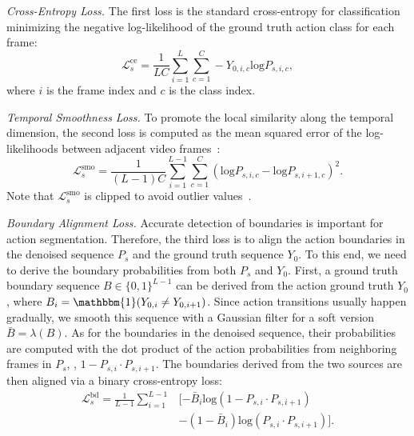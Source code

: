 \documentclass[10pt,twocolumn,letterpaper]{article}
\begin{document}
\textit{Cross-Entropy Loss.} 
The first loss is the standard cross-entropy for classification minimizing the negative log-likelihood of the ground truth action class for each frame:
\begin{equation}  \label{eq:8}
\mathcal{L}^{\mathrm{ce}}_s = \frac{1}{LC}\sum_{i=1}^L\sum_{c=1}^C -Y_{0,i,c} \mathrm{log}P_{s,i,c},
\end{equation}
where $i$ is the frame index and $c$ is the class index.


\textit{Temporal Smoothness Loss.} 
To promote the local similarity along the temporal dimension, the second loss is computed as the mean squared error of the log-likelihoods between adjacent video frames~\cite{2019_CVPR_Farha,2020_PAMI_Li}:
\begin{equation}  \label{eq:9}
\mathcal{L}^{\mathrm{smo}}_s = \frac{1}{(L-1)C}\sum_{i=1}^{L-1}\sum_{c=1}^C {(\mathrm{log}P_{s,i,c} -\mathrm{log}P_{s,i+1,c})}^2.
\end{equation}
Note that $\mathcal{L}^{\mathrm{smo}}_s$ is clipped to avoid outlier values~\cite{2019_CVPR_Farha}.



\textit{Boundary Alignment Loss.} 
Accurate detection of boundaries is important for action segmentation. 
Therefore, the third loss is to align the action boundaries in the denoised sequence $P_s$ and the ground truth sequence $Y_0$.
To this end, we need to derive the boundary probabilities from both $P_s$ and $Y_0$.
First, a ground truth boundary sequence $B \in \{0,1\}^{L-1}$ can be derived from the action ground truth $Y_0$, where $B_i = \mathbbm{1}(Y_{0,i} \neq Y_{0,i+1})$.
Since action transitions usually happen gradually, we smooth this sequence with a Gaussian filter for a soft version $\bar{B} = \lambda(B)$. 
As for the boundaries in the denoised sequence, their probabilities are computed with the dot product of the action probabilities from neighboring frames in $P_s$, \ie, $1 - P_{s,i} \cdot P_{s,i+1}$.
The boundaries derived from the two sources are then aligned via a binary cross-entropy loss:
\begin{equation}  \label{eq:10}
\begin{split}
\mathcal{L}^{\mathrm{bd}}_s = \frac{1}{L-1}\sum_{i=1}^{L-1} & [- \bar{B}_i \mathrm{log}(1 - P_{s,i} \cdot P_{s,i+1}) \\
& - (1-\bar{B}_i) \mathrm{log}(P_{s,i} \cdot P_{s,i+1})].
\end{split}
\end{equation}
\end{document}
